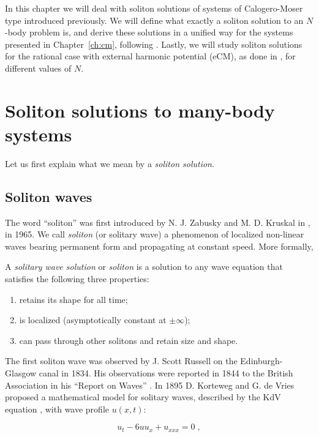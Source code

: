 In this chapter we will deal with soliton solutions of systems of Calogero-Moser type introduced previously. We will define what exactly a soliton solution to an $N$-body problem is, and derive these solutions in a unified way for the systems presented in Chapter~\ref{ch:cm}, following \cite{philip2019soliton}. Lastly, we will study soliton solutions for the rational case with external harmonic potential (eCM), as done in \cite{kulkarni2017, abanov2011}, for different values of $N$. 

\section{Soliton solutions to many-body systems}
Let us first explain what we mean by a \textit{soliton solution}. 

\subsection{Soliton waves}
The word ``soliton'' was first introduced by N. J. Zabusky and M. D. Kruskal in \cite{zabusky1965}, in 1965. We call \textit{soliton} (or solitary wave) a phenomenon of localized non-linear waves bearing permanent form and propagating at constant speed. More formally,

\begin{defi}
A \textit{solitary wave solution} or \textit{soliton} is a solution to any wave equation that satisfies the following three properties:

\begin{enumerate}
    \item retains its shape for all time;
    \item is localized (asymptotically constant at $\pm \infty$);
    \item can pass through other solitons and retain size and shape.
\end{enumerate}
\end{defi}

The first soliton wave was observed by J. Scott Russell on the Edinburgh-Glasgow canal in 1834. His observations were reported in 1844 to the British Association in his ``Report on Waves'' \cite{russell1844}. In 1895 D. Korteweg and G. de Vries proposed a mathematical model for solitary waves, described by the KdV equation \cite{korteweg1895}, with wave profile $u(x,t)$:

\begin{equation}
    u_t - 6uu_x + u_{xxx} = 0\;,
\end{equation}

